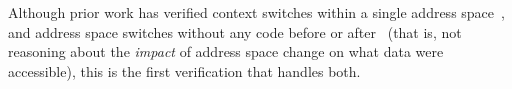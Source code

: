 Although prior work has verified context switches within a single address space~\cite{ni2007contexts}, and address space switches
without any code before or after~\cite{syeda2020formal} (that is, not reasoning about the \emph{impact} of address space change
on what data were accessible), this is the first verification that handles both.



